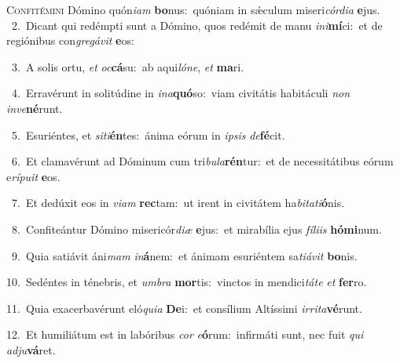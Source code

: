\lettrine{\initial\textcolor{\initialcolor}{C}}{onfitémini} Dómino quón\-\textit{i}\-\textit{am} \textbf{bo}\-nus:~\star quóniam in sǽculum miseri\-\textit{cór}\-\textit{di}\textit{a} \textbf{e}\-jus.\\
{\numbfont\textcolor{\numbcolor}{~2.}}~Dicant qui redémpti sunt a Dómino, quos redémit de manu \textit{in}\-\textit{i}\textbf{mí}ci:~\star et de regiónibus con\-\textit{gre}\-\textit{gá}\textit{vit} \textbf{e}\-os:\par
{\numbfont\textcolor{\numbcolor}{~3.}}~A solis ortu, \textit{et} \textit{oc}\-\textbf{cá}su:~\star ab aqui\-\textit{ló}\-\textit{ne}, \textit{et} \textbf{ma}\-ri.\par
{\numbfont\textcolor{\numbcolor}{~4.}}~Erravérunt in solitúdine in \textit{in}\-\textit{a}\textbf{quó}so:~\star viam civitátis habitáculi \textit{non} \textit{in}\-\textit{ve}\textbf{né}runt.\par
{\numbfont\textcolor{\numbcolor}{~5.}}~Esuriéntes, et \textit{si}\-\textit{ti}\textbf{én}tes:~\star ánima eórum in \textit{ip}\-\textit{sis} \textit{de}\-\textbf{fé}cit.\par
{\numbfont\textcolor{\numbcolor}{~6.}}~Et clamavérunt ad Dóminum cum tri\-\textit{bu}\-\textit{la}\textbf{rén}tur:~\star et de necessitátibus eórum e\-\textit{rí}\-\textit{pu}\textit{it} \textbf{e}\-os.\par
{\numbfont\textcolor{\numbcolor}{~7.}}~Et dedúxit eos in \textit{vi}\-\textit{am} \textbf{rec}\-tam:~\star ut irent in civitátem ha\-\textit{bi}\-\textit{ta}\textit{ti}\textbf{ó}nis.\par
{\numbfont\textcolor{\numbcolor}{~8.}}~Confiteántur Dómino misericór\-\textit{di}\-\textit{æ} \textbf{e}\-jus:~\star et mirabília ejus \textit{fí}\-\textit{li}\textit{is} \textbf{hó}\-\textbf{mi}num.\par
{\numbfont\textcolor{\numbcolor}{~9.}}~Quia satiávit áni\textit{mam} \textit{in}\-\textbf{á}nem:~\star et ánimam esuriéntem sa\-\textit{ti}\-\textit{á}\textit{vit} \textbf{bo}\-nis.\par
{\numbfont\textcolor{\numbcolor}{10.}}~Sedéntes in ténebris, et \textit{um}\-\textit{bra} \textbf{mor}\-tis:~\star vinctos in mendici\-\textit{tá}\-\textit{te} \textit{et} \textbf{fer}\-ro.\par
{\numbfont\textcolor{\numbcolor}{11.}}~Quia exacerbavérunt eló\-\textit{qui}\-\textit{a} \textbf{De}\-i:~\star et consílium Altíssimi \textit{ir}\-\textit{ri}\textit{ta}\textbf{vé}runt.\par
{\numbfont\textcolor{\numbcolor}{12.}}~Et humiliátum est in labóribus \textit{cor} \textit{e}\-\textbf{ó}rum:~\star infirmáti sunt, nec fuit \textit{qui} \textit{ad}\-\textit{ju}\textbf{vá}ret.\par
